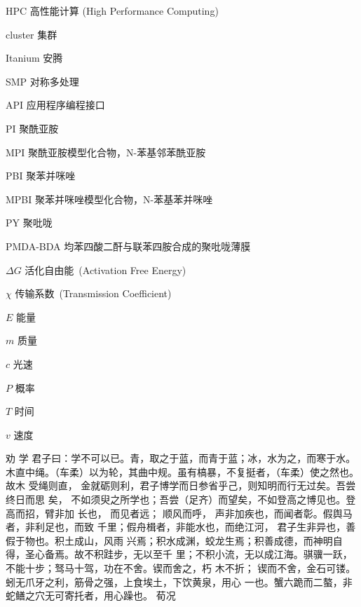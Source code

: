 \begin{denotation}

\item[HPC] 高性能计算 (High Performance Computing)
\item[cluster] 集群
\item[Itanium] 安腾
\item[SMP] 对称多处理
\item[API] 应用程序编程接口
\item[PI]	聚酰亚胺
\item[MPI]	聚酰亚胺模型化合物，N-苯基邻苯酰亚胺
\item[PBI]	聚苯并咪唑
\item[MPBI]	聚苯并咪唑模型化合物，N-苯基苯并咪唑
\item[PY]	聚吡咙
\item[PMDA-BDA]	均苯四酸二酐与联苯四胺合成的聚吡咙薄膜
\item[$\Delta G$]  	活化自由能~(Activation Free Energy)
\item [$\chi$] 传输系数~(Transmission Coefficient)
\item[$E$] 能量
\item[$m$] 质量
\item[$c$] 光速
\item[$P$] 概率
\item[$T$] 时间
\item[$v$] 速度
\item[劝  学] 君子曰：学不可以已。青，取之于蓝，而青于蓝；冰，水为之，而寒于水。
  木直中绳。（车柔）以为轮，其曲中规。虽有槁暴，不复挺者，（车柔）使之然也。故木
  受绳则直， 金就砺则利，君子博学而日参省乎己，则知明而行无过矣。吾尝终日而思
  矣，  不如须臾之所学也；吾尝（足齐）而望矣，不如登高之博见也。登高而招，臂非加
  长也，  而见者远；  顺风而呼，  声非加疾也，而闻者彰。假舆马者，非利足也，而致
  千里；假舟楫者，非能水也，而绝江河，  君子生非异也，善假于物也。积土成山，风雨
  兴焉；积水成渊，蛟龙生焉；积善成德，而神明自得，圣心备焉。故不积跬步，无以至千
  里；不积小流，无以成江海。骐骥一跃，不能十步；驽马十驾，功在不舍。锲而舍之，朽
  木不折；  锲而不舍，金石可镂。蚓无爪牙之利，筋骨之强，上食埃土，下饮黄泉，用心
  一也。蟹六跪而二螯，非蛇鳝之穴无可寄托者，用心躁也。\pozhehao{} 荀况
\end{denotation}

